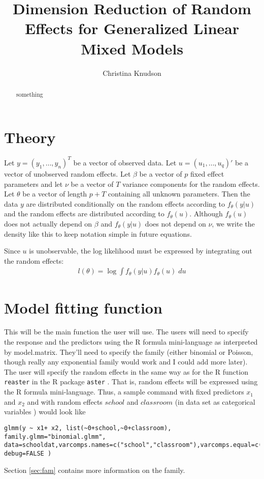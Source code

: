 \documentclass{article}
\title{Dimension Reduction of Random Effects for Generalized Linear Mixed Models}
\author{Christina Knudson}
\begin{document}
\maketitle{}

\begin{abstract}
something
\end{abstract}

\section{Theory}

Let $y=(y_1, \ldots, y_n)^T$ be a vector of observed data. Let $u=(u_1,\ldots,u_q)'$ be a vector of unobserved random effects. Let $\beta$ be a vector of $p$ fixed effect parameters and let $\nu$ be a vector of $T$ variance components for the random effects. Let $\theta$ be a vector of length $p+T$ containing all unknown parameters. Then the data $y$ are distributed conditionally on the random effects according to $f_\theta(y|u)$ and the random effects are distributed according to $f_\theta(u)$. Although $f_\theta(u)$ does not actually depend on $\beta$ and $f_\theta(y|u)$ does not depend on $\nu$, we write the density like this to keep notation simple in future equations.

Since $u$ is unobservable, the log likelihood must be expressed by integrating out the random effects:
\begin{align}
l(\theta)=\log \int f_\theta(y|u) f_\theta(u) \; du
\end{align}


\section{Model fitting function} 
This will be the main function the user will use. The users will need to specify the response and the predictors using the R formula mini-language as interpreted by model.matrix. They'll need to specify the  family (either binomial or Poisson, though  really any exponential family would work and I could add more later). The user will specify the random effects in the same way as for the R function \texttt{reaster} in the R package
 \texttt{aster} \citep{aster-package}. That is, random effects will be expressed using the R formula mini-language. Thus, a sample command with fixed predictors $x_1$ and $x_2$ and with random effects $school$ and $classroom$ (in data set as categorical variables ) would look like
\begin{verbatim}
glmm(y ~ x1+ x2, list(~0+school,~0+classroom),  family.glmm="binomial.glmm", 
data=schooldat,varcomps.names=c("school","classroom"),varcomps.equal=c(1,2),
debug=FALSE )
 \end{verbatim} 
Section \ref{sec:fam} contains more information on the family.
\end{document}
